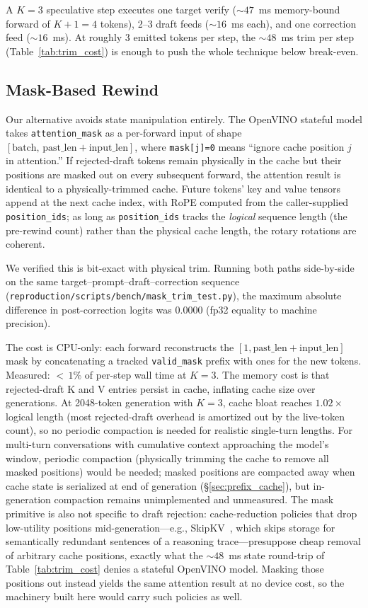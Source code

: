 \documentclass[11pt]{article}
\newcommand{\brk}{\discretionary{}{}{}}
\begin{document}
A $K\!=\!3$ speculative step executes one target verify ($\sim 47$~ms memory-bound forward of $K\!+\!1\!=\!4$ tokens), 2--3 draft feeds ($\sim 16$~ms each), and one correction feed ($\sim 16$~ms). At roughly 3 emitted tokens per step, the $\sim 48$~ms trim per step (Table~\ref{tab:trim_cost}) is enough to push the whole technique below break-even.

\subsection{Mask-Based Rewind}

Our alternative avoids state manipulation entirely. The OpenVINO stateful model takes \texttt{attention\_\brk mask} as a per-forward input of shape $[\mathrm{batch},\,\mathrm{past\_len}+\mathrm{input\_len}]$, where \texttt{mask[j]=0} means ``ignore cache position $j$ in attention.'' If rejected-draft tokens remain physically in the cache but their positions are masked out on every subsequent forward, the attention result is identical to a physically-trimmed cache. Future tokens' key and value tensors append at the next cache index, with RoPE computed from the caller-supplied \texttt{position\_\brk ids}; as long as \texttt{position\_\brk ids} tracks the \emph{logical} sequence length (the pre-rewind count) rather than the physical cache length, the rotary rotations are coherent.

We verified this is bit-exact with physical trim. Running both paths side-by-side on the same target--prompt--draft--correction sequence (\texttt{reproduction/\brk scripts/\brk bench/\brk mask\_trim\_test.py}), the maximum absolute difference in post-correction logits was $0.0000$ (fp32 equality to machine precision).

The cost is CPU-only: each forward reconstructs the $[1, \mathrm{past\_len}+\mathrm{input\_len}]$ mask by concatenating a tracked \texttt{valid\_mask} prefix with ones for the new tokens. Measured: $<\,1\%$ of per-step wall time at $K\!=\!3$. The memory cost is that rejected-draft K and V entries persist in cache, inflating cache size over generations. At 2048-token generation with $K\!=\!3$, cache bloat reaches $1.02\times$ logical length (most rejected-draft overhead is amortized out by the live-token count), so no periodic compaction is needed for realistic single-turn lengths. For multi-turn conversations with cumulative context approaching the model's window, periodic compaction (physically trimming the cache to remove all masked positions) would be needed; masked positions are compacted away when cache state is serialized at end of generation (\S\ref{sec:prefix_cache}), but in-generation compaction remains unimplemented and unmeasured. The mask primitive is also not specific to draft rejection: cache-reduction policies that drop low-utility positions mid-generation---e.g., SkipKV~\cite{tian2025skipkv}, which skips storage for semantically redundant sentences of a reasoning trace---presuppose cheap removal of arbitrary cache positions, exactly what the $\sim 48$~ms state round-trip of Table~\ref{tab:trim_cost} denies a stateful OpenVINO model. Masking those positions out instead yields the same attention result at no device cost, so the machinery built here would carry such policies as well.
\end{document}
